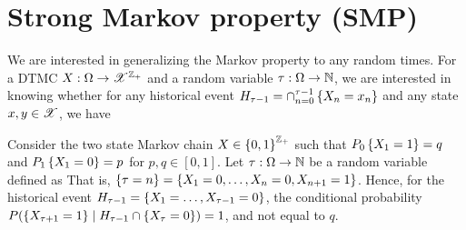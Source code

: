 \documentclass[letterpaper,10pt,english]{article}
\begin{document}

\section{Strong Markov property (SMP)}
We are interested in generalizing the Markov property to any random times. 
For a DTMC $X: \Omega \to \mathscr{X}^{\mathbb{Z}_+}$ and a random variable $\tau: \Omega \to \mathbb{N}$, 
we are interested in knowing whether for any historical event $H_{\tau-1} = \cap_{n = 0}^{\tau-1}\left\{X_n = x_n\right\}$ and any state $x, y \in \mathscr{X}$, we have 
\begin{shaded}
\begin{exmp} 
Consider the two state Markov chain $X \in \left\{0, 1\right\}^{\mathbb{Z}_+}$ such that $P_0\left\{X_1 = 1\right\} = q$ and $P_1\left\{X_1=0\right\} = p$ for $p,q \in [0,1]$.   
Let $\tau : \Omega \to \mathbb{N}$ be a random variable defined as 
That is, $\left\{\tau = n\right\} = \left\{X_1 = 0, \dots, X_n = 0, X_{n+1} = 1\right\}$. 
Hence, for the historical event $H_{\tau-1} = \left\{X_1 = \dots, X_{\tau-1} = 0\right\}$, 
the conditional probability $P(\left\{X_{\tau+1}= 1\right\}\mid H_{\tau-1}\cap\left\{X_\tau = 0\right\}) = 1$, %
and not equal to $q$. 
\end{exmp}
\end{shaded}
\end{document}
